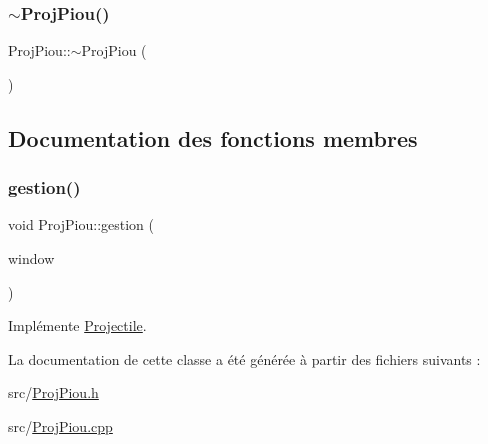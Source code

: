 \mbox{\label{class_proj_piou_a02224f153ad53afc2b1c40b986ec6492}} 
\subsubsection{\texorpdfstring{$\sim$\+Proj\+Piou()}{~ProjPiou()}}
{\footnotesize\ttfamily Proj\+Piou\+::$\sim$\+Proj\+Piou (\begin{DoxyParamCaption}{ }\end{DoxyParamCaption})}



\subsection{Documentation des fonctions membres}
\mbox{\label{class_proj_piou_a964182d333ed2bf64408a7812bc4cd28}} 
\subsubsection{\texorpdfstring{gestion()}{gestion()}}
{\footnotesize\ttfamily void Proj\+Piou\+::gestion (\begin{DoxyParamCaption}\item[{sf\+::\+Render\+Window \&}]{window }\end{DoxyParamCaption})\hspace{0.3cm}{\ttfamily [virtual]}}



Implémente \hyperlink{class_projectile_aa969857f9837d9be3a6ea415c9ba3ff1}{Projectile}.



La documentation de cette classe a été générée à partir des fichiers suivants \+:\begin{DoxyCompactItemize}
\item 
src/\hyperlink{_proj_piou_8h}{Proj\+Piou.\+h}\item 
src/\hyperlink{_proj_piou_8cpp}{Proj\+Piou.\+cpp}\end{DoxyCompactItemize}
